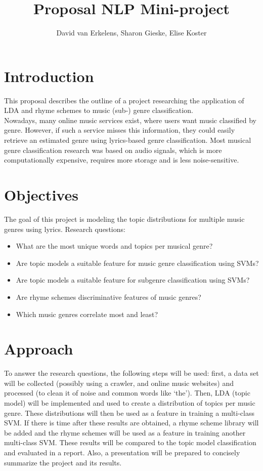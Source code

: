 \documentclass[12pt,a4paper]{amsart}
\title{Proposal NLP Mini-project}
\author{David van Erkelens, Sharon Gieske, Elise Koster}
\date{}
\begin{document}
\maketitle

\section{Introduction}
This proposal describes the outline of a project researching the application of LDA and rhyme schemes to music (sub-) genre classification.\\
Nowadays, many online music services exist, where users want music classified by genre. However, if such a service misses this information, they could easily retrieve an estimated genre using lyrics-based genre classification. 
Most musical genre classification research was based on audio signals, which is more computationally expensive, requires more storage and is less noise-sensitive. \\


\section{Objectives}
The goal of this project is modeling the topic distributions for multiple music genres using lyrics. 
Research questions:
\begin{itemize}
\item What are the most unique words and topics per musical genre?
\item Are topic models a suitable feature for music genre classification using SVMs?
\item Are topic models a suitable feature for subgenre classification using SVMs?
\item Are rhyme schemes discriminative features of music genres?
\item Which music genres correlate most and least?
\end{itemize}

\section{Approach}
To answer the research questions, the following steps will be used: first, a data set will be collected (possibly using a crawler, and online music websites) and processed (to clean it of noise and common words like `the'). Then, LDA (topic model) will be implemented and used to create a distribution of topics per music genre. These distributions will then be used as a feature in training a multi-class SVM. If there is time after these results are obtained, a rhyme scheme library will be added and the rhyme schemes will be used as a feature in training another multi-class SVM. These results will be compared to the topic model classification and evaluated in a report. Also, a presentation will be prepared to concisely summarize the project and its results.
\end{document}
